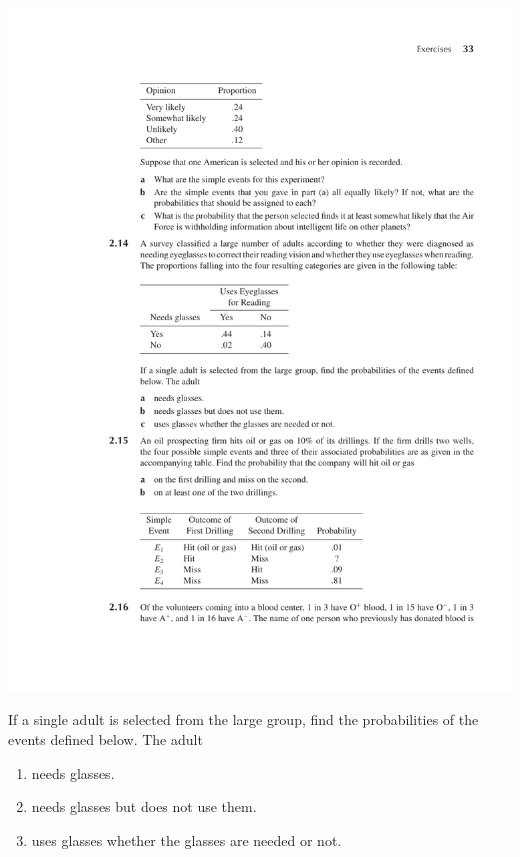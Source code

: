 \documentclass[12pt,reqno]{amsart}
\begin{document}
\medskip
\begin{center}
\includegraphics[scale=1]{img.pdf}
\end{center}
\medskip

If a single adult is selected from the large group, find the probabilities of the events defined below. The adult

\medskip
\begin{enumerate}
\item needs glasses.\vfill
\item needs glasses but does not use them.\vfill
\item uses glasses whether the glasses are needed or not.\vfill
\end{enumerate}
\end{document}
